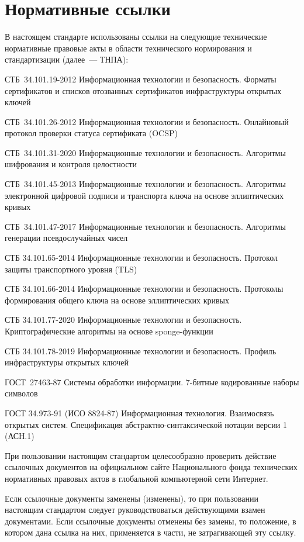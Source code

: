 \chapter{Нормативные ссылки}\label{REFS}

В настоящем стандарте использованы ссылки на следующие технические 
нормативные правовые акты в области технического нормирования и 
стандартизации (далее~--- ТНПА):  

СТБ~34.101.19-2012 Информационная технологии и безопасность. Форматы 
сертификатов и списков отозванных сертификатов инфраструктуры открытых 
ключей 

СТБ~34.101.26-2012 Информационная технологии и безопасность. Онлайновый 
протокол проверки статуса сертификата (OCSP)

СТБ~34.101.31-2020 Информационные технологии и безопасность. Алгоритмы 
шифрования и контроля целостности

СТБ~34.101.45-2013 Информационные технологии и безопасность. Алгоритмы  
электронной цифровой подписи и транспорта ключа на основе эллиптических 
кривых 

СТБ~34.101.47-2017 Информационные технологии и безопасность. Алгоритмы 
генерации псевдослучайных чисел

СТБ 34.101.65-2014 Информационные технологии и безопасность. 
Протокол защиты транспортного уровня (TLS)

СТБ 34.101.66-2014 Информационные технологии и безопасность. 
Протоколы формирования общего ключа на основе эллиптических кривых

СТБ 34.101.77-2020 Информационные технологии и безопасность. 
Криптографические алгоритмы на основе sponge-функции

СТБ 34.101.78-2019 Информационные технологии и безопасность. 
Профиль инфраструктуры открытых ключей

ГОСТ~27463-87 Системы обработки информации. 7-битные кодированные наборы 
символов

ГОСТ 34.973-91 (ИСО 8824-87) Информационная технология. Взаимосвязь 
открытых систем. Спецификация абстрактно-синтаксической нотации версии 1 
(АСН.1) 

\begin{note*}
При пользовании настоящим стандартом целесообразно проверить действие
ссылочных документов на официальном сайте Национального фонда
технических нормативных правовых актов в глобальной компьютерной сети Интернет.

Если ссылочные документы заменены (изменены), то при пользовании настоящим
стандартом следует руководствоваться действующими взамен документами. Если
ссылочные документы отменены без замены, то положение, в котором дана ссылка на
них, применяется в части, не затрагивающей эту ссылку.
\end{note*}

